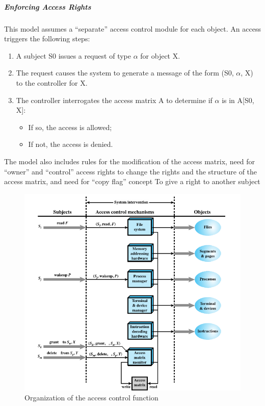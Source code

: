 \documentclass{article}
\begin{document}
                            \subparagraph{Enforcing Access Rights}  This model assumes a “separate” access
                            control module for each object. An access triggers the following steps: 
                            \begin{enumerate}
                                \item A subject S0 issues a request of type $\alpha$ for object X.
                                \item The request causes the system to generate a message of the form (S0, $\alpha$, X) to the controller for X.
                                \item The controller interrogates the access matrix A to determine if $\alpha$ is in A[S0, X]:
                                \begin{itemize}
                                    \item If so, the access is allowed;
                                    \item If not, the access is denied.
                                \end{itemize}
                            \end{enumerate}
                            The model also includes rules for the
                            modification of the access matrix, need for “owner” and “control” access
                            rights to change the rights and the structure of the
                            access matrix, and  need for “copy flag” concept To give a right to another subject
                            \begin{figure}[h]
                                \begin{center}
                                    \includegraphics[scale=0.5]{../immagini/access_control_fucntion.png}
                                \end{center}
                                \caption{Organization of the access control function}
                            \end{figure}   
\end{document}
